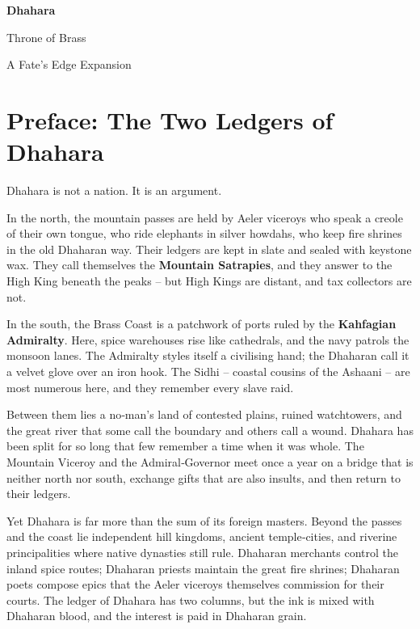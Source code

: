 \documentclass[11pt]{book}
\begin{document}
\frontmatter
\begin{titlepage}
\centering
\vspace*{2cm}
{\huge\bfseries Dhahara\par}
\vspace{0.5cm}
{\Large Throne of Brass\par}
\vspace{2cm}
{\large A Fate's Edge Expansion\par}
\vspace{1.5cm}
\vfill
\end{titlepage}

\tableofcontents

\mainmatter

\chapter*{Preface: The Two Ledgers of Dhahara}

Dhahara is not a nation. It is an argument.

In the north, the mountain passes are held by Aeler viceroys who speak a creole of their own tongue, who ride elephants in silver howdahs, who keep fire shrines in the old Dhaharan way. Their ledgers are kept in slate and sealed with keystone wax. They call themselves the \textbf{Mountain Satrapies}, and they answer to the High King beneath the peaks -- but High Kings are distant, and tax collectors are not.

In the south, the Brass Coast is a patchwork of ports ruled by the \textbf{Kahfagian Admiralty}. Here, spice warehouses rise like cathedrals, and the navy patrols the monsoon lanes. The Admiralty styles itself a civilising hand; the Dhaharan call it a velvet glove over an iron hook. The Sidhi -- coastal cousins of the Ashaani -- are most numerous here, and they remember every slave raid.

Between them lies a no‑man's land of contested plains, ruined watchtowers, and the great river that some call the boundary and others call a wound. Dhahara has been split for so long that few remember a time when it was whole. The Mountain Viceroy and the Admiral‑Governor meet once a year on a bridge that is neither north nor south, exchange gifts that are also insults, and then return to their ledgers.

Yet Dhahara is far more than the sum of its foreign masters. Beyond the passes and the coast lie independent hill kingdoms, ancient temple‑cities, and riverine principalities where native dynasties still rule. Dhaharan merchants control the inland spice routes; Dhaharan priests maintain the great fire shrines; Dhaharan poets compose epics that the Aeler viceroys themselves commission for their courts. The ledger of Dhahara has two columns, but the ink is mixed with Dhaharan blood, and the interest is paid in Dhaharan grain.
\end{document}
